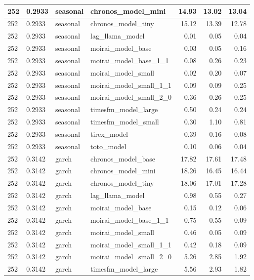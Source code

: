 {\begin{tabular}{llllrrr}
\midrule
252 & 0.2933 & seasonal & chronos\_model\_mini & 14.93 & 13.02 & 13.04 \\
\midrule
252 & 0.2933 & seasonal & chronos\_model\_tiny & 15.12 & 13.39 & 12.78 \\
\midrule
252 & 0.2933 & seasonal & lag\_llama\_model & 0.01 & 0.05 & 0.04 \\
\midrule
252 & 0.2933 & seasonal & moirai\_model\_base & 0.03 & 0.05 & 0.16 \\
\midrule
252 & 0.2933 & seasonal & moirai\_model\_base\_1\_1 & 0.08 & 0.26 & 0.23 \\
\midrule
252 & 0.2933 & seasonal & moirai\_model\_small & 0.02 & 0.20 & 0.07 \\
\midrule
252 & 0.2933 & seasonal & moirai\_model\_small\_1\_1 & 0.09 & 0.09 & 0.25 \\
\midrule
252 & 0.2933 & seasonal & moirai\_model\_small\_2\_0 & 0.36 & 0.26 & 0.25 \\
\midrule
252 & 0.2933 & seasonal & timesfm\_model\_large & 0.50 & 0.24 & 0.24 \\
\midrule
252 & 0.2933 & seasonal & timesfm\_model\_small & 0.30 & 1.10 & 0.81 \\
\midrule
252 & 0.2933 & seasonal & tirex\_model & 0.39 & 0.16 & 0.08 \\
\midrule
252 & 0.2933 & seasonal & toto\_model & 0.10 & 0.06 & 0.04 \\
\midrule
252 & 0.3142 & garch & chronos\_model\_base & 17.82 & 17.61 & 17.48 \\
\midrule
252 & 0.3142 & garch & chronos\_model\_mini & 18.26 & 16.45 & 16.44 \\
\midrule
252 & 0.3142 & garch & chronos\_model\_tiny & 18.06 & 17.01 & 17.28 \\
\midrule
252 & 0.3142 & garch & lag\_llama\_model & 0.98 & 0.55 & 0.27 \\
\midrule
252 & 0.3142 & garch & moirai\_model\_base & 0.15 & 0.12 & 0.06 \\
\midrule
252 & 0.3142 & garch & moirai\_model\_base\_1\_1 & 0.75 & 0.55 & 0.09 \\
\midrule
252 & 0.3142 & garch & moirai\_model\_small & 0.46 & 0.05 & 0.09 \\
\midrule
252 & 0.3142 & garch & moirai\_model\_small\_1\_1 & 0.42 & 0.18 & 0.09 \\
\midrule
252 & 0.3142 & garch & moirai\_model\_small\_2\_0 & 5.26 & 2.85 & 1.92 \\
\midrule
252 & 0.3142 & garch & timesfm\_model\_large & 5.56 & 2.93 & 1.82 \\

\end{tabular}}
